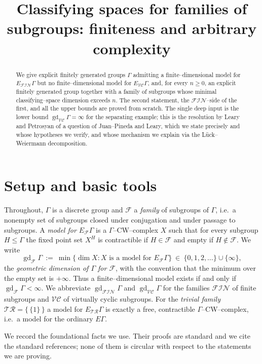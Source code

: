 \documentclass{amsart}
\theoremstyle{definition}
\newcommand{\FIN}{\mathcal{F\!I\!N}}
\newcommand{\VC}{\mathcal{V\!C}}
\newcommand{\gd}{\operatorname{gd}}
\begin{document}
\title{Classifying spaces for families of subgroups: finiteness and arbitrary complexity}
\maketitle

\begin{abstract}
We give explicit finitely generated groups $\Gamma$ admitting a finite--dimensional model
for $E_{\FIN}\Gamma$ but no finite--dimensional model for $E_{\VC}\Gamma$, and, for every
$n\ge 0$, an explicit finitely generated group together with a family of subgroups whose
minimal classifying--space dimension exceeds $n$. The second statement, the $\FIN$--side of
the first, and all the upper bounds are proved from scratch. The single deep input is the
lower bound $\gd_{\VC}\Gamma=\infty$ for the separating example; this is the resolution by
Leary and Petrosyan of a question of Juan--Pineda and Leary, which we state precisely and
whose hypotheses we verify, and whose mechanism we explain via the Lück--Weiermann
decomposition.
\end{abstract}

\section{Setup and basic tools}

Throughout, $\Gamma$ is a discrete group and $\mathcal F$ a \emph{family} of subgroups of
$\Gamma$, i.e.\ a nonempty set of subgroups closed under conjugation and under passage to
subgroups. A \emph{model for $E_{\mathcal F}\Gamma$} is a $\Gamma$--CW--complex $X$ such that
for every subgroup $H\le\Gamma$ the fixed point set $X^H$ is contractible if $H\in\mathcal F$
and empty if $H\notin\mathcal F$. We write
\[
\gd_{\mathcal F}\Gamma\ :=\ \min\{\dim X : X \text{ is a model for } E_{\mathcal F}\Gamma\}\ \in\ \{0,1,2,\dots\}\cup\{\infty\},
\]
the \emph{geometric dimension of $\Gamma$ for $\mathcal F$}, with the convention that the
minimum over the empty set is $+\infty$. Thus a finite--dimensional model exists if and only if
$\gd_{\mathcal F}\Gamma<\infty$. We abbreviate $\gd_{\FIN}\Gamma$ and $\gd_{\VC}\Gamma$ for the
families $\FIN$ of finite subgroups and $\VC$ of virtually cyclic subgroups. For the
\emph{trivial family} $\mathcal{TR}=\{\,\{1\}\,\}$ a model for $E_{\mathcal{TR}}\Gamma$ is
exactly a free, contractible $\Gamma$--CW--complex, i.e.\ a model for the ordinary $E\Gamma$.

We record the foundational facts we use. Their proofs are standard and we cite the standard
references; none of them is circular with respect to the statements we are proving.
\end{document}
